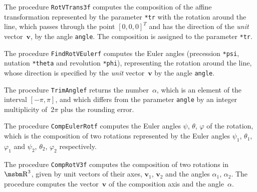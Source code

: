 \vspace{\bigskipamount}
\begin{sloppypar}
The procedure \texttt{RotVTrans3f} computes the composition of the
affine transformation represented by the parameter
\texttt{*tr} with the rotation around the line, which passes through
the point $[0,0,0]^T$ and has the direction of the \emph{unit}
vector~$\bm{v}$, by the angle \texttt{angle}.
The composition is assigned to the parameter \texttt{*tr}.
\end{sloppypar}

\vspace{\bigskipamount}
The procedure \texttt{FindRotVEulerf} computes the Euler angles (precession
\texttt{*psi}, nutation \texttt{*theta} and revolution \texttt{*phi}),
representing the rotation around the line, whose direction is specified by
the \emph{unit} vector~$\bm{v}$ by the angle \texttt{angle}.

\vspace{\bigskipamount}
\begin{sloppypar}
The procedure \texttt{TrimAnglef} returns the number~$\alpha$, which is an
element of the interval $[-\pi,\pi]$, and which differs from the parameter
\texttt{angle} by an integer multiplicity of~$2\pi$ plus the rounding error.
\end{sloppypar}

\vspace{\bigskipamount}
The procedure \texttt{CompEulerRotf} computes the Euler angles $\psi$, $\theta$,
$\varphi$ of the rotation, which is the composition of two rotations
represented by the Euler angles $\psi_1$, $\theta_1$, $\varphi_1$ and
$\psi_2$, $\theta_2$, $\varphi_2$ respectively.

\vspace{\bigskipamount}
The procedure \texttt{CompRotV3f} computes the composition of two rotations
in~$\R^3$, given by unit vectors of their axes, $\bm{v}_1$, $\bm{v}_2$
and the angles $\alpha_1$, $\alpha_2$. The procedure computes the vector~$\bm{v}$
of the composition axis and the angle~$\alpha$.

